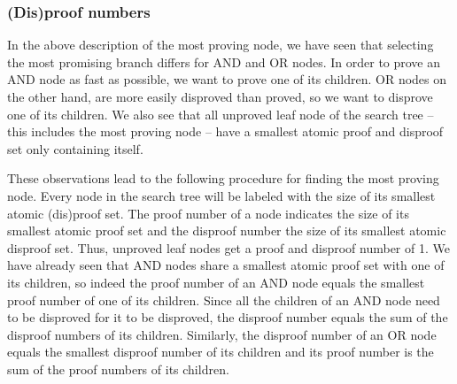 \documentclass{article}
\begin{document}
\subsubsection*{(Dis)proof numbers}
In the above description of the most proving node, we have seen that selecting the most promising branch differs for AND and OR nodes.
In order to prove an AND node as fast as possible, we want to prove one of its children. OR nodes on the other hand, are more easily disproved than
proved, so we want to disprove one of its children. We also see that all unproved leaf node of the search tree -- this includes the most proving
node -- have a smallest atomic proof and disproof set only containing itself.

These observations lead to the following procedure for finding the most proving node. Every node in the search tree will be labeled with the
size of its smallest atomic (dis)proof set. The proof number of a node indicates the size of its smallest atomic proof set and the disproof number
the size of its smallest atomic disproof set. Thus, unproved leaf nodes get a proof and disproof number of 1. We have already seen that AND nodes share
a smallest atomic proof set with one of its children, so indeed the proof number of an AND node equals the smallest proof number of one of
its children. Since all the children of an AND node need to be disproved for it to be disproved, the disproof number equals the sum of the disproof
numbers of its children. Similarly, the disproof number of an OR node equals the smallest disproof number of its children and its proof number
is the sum of the proof numbers of its children.
\end{document}

